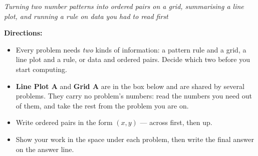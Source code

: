 \documentclass[12pt]{article}
\begin{document}

\begin{center}\small\textit{Turning two number patterns into ordered pairs on a grid,
summarising a line plot, and running a rule on data you had to read first}\end{center}

\noindent\small\textbf{Directions:}
\begin{itemize}[label={$\bullet$}, leftmargin=1.1cm, itemsep=1pt, topsep=2pt]
  \item Every problem needs \emph{two} kinds of information: a pattern rule and a grid, a
        line plot and a rule, or data and ordered pairs. Decide which two before you
        start computing.
  \item \textbf{Line Plot A} and \textbf{Grid A} are in the box below and are shared by
        several problems. They carry no problem's numbers: read the numbers you need out
        of them, and take the rest from the problem you are on.
  \item Write ordered pairs in the form $(x, y)$ --- across first, then up.
  \item Show your work in the space under each problem, then write the final answer on
        the answer line.
\end{itemize}
\normalsize
\end{document}

